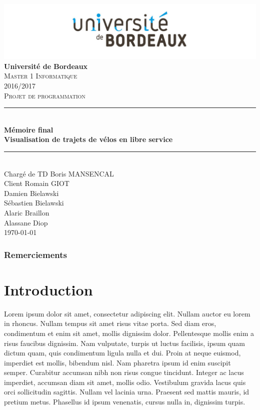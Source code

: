 \documentclass[12pt]{article}
\begin{document}
	\begin{titlepage}
		\includegraphics[scale=0.2]{logo_bordeaux.png}\\
		\centering
		\linebreak
		{\LARGE \bfseries Université de Bordeaux}\\ [2cm]
		\textsc{\Large Master 1 Informatique}\\ [0,3cm]
		\textsc{\Large 2016/2017}\\ [1,4cm]

		\textsc{\Large Projet de programmation}\\ [1.4cm]

		\rule{16cm}{1mm}\\ [0,7cm]
		{\huge \bfseries Mémoire final}\\ [0,5cm]
		{\huge \bfseries Visualisation de trajets de vélos en libre service} \\[0,7cm]
		\rule{16cm}{1mm}\\ [1cm]

		{\Large Chargé de TD Boris MANSENCAL }\\ [0,3cm]
		{\Large Client Romain GIOT }\\ [1cm]

		{\Large Damien Bielawski }\\ [0,3cm]
		{\Large Sébastien Bielawski }\\[0,3cm]
		{\Large Alaric Braillon }\\ [0,3cm]
		{\Large Alassane Diop }\\ [2cm]
		\Large\today

	\end{titlepage}

 
\tableofcontents \newpage

\section*{Remerciements} \newpage

\part{Introduction}
Lorem ipsum dolor sit amet, consectetur adipiscing elit. Nullam auctor eu lorem in rhoncus. Nullam tempus sit amet risus vitae porta. Sed diam eros, condimentum et enim sit amet, mollis dignissim dolor. Pellentesque mollis enim a risus faucibus dignissim. Nam vulputate, turpis ut luctus facilisis, ipsum quam dictum quam, quis condimentum ligula nulla et dui. Proin at neque euismod, imperdiet est mollis, bibendum nisl. Nam pharetra ipsum id enim suscipit semper. Curabitur accumsan nibh non risus congue tincidunt. Integer ac lacus imperdiet, accumsan diam sit amet, mollis odio. Vestibulum gravida lacus quis orci sollicitudin sagittis. Nullam vel lacinia urna. Praesent sed mattis mauris, id pretium metus. Phasellus id ipsum venenatis, cursus nulla in, dignissim turpis.
\end{document}
